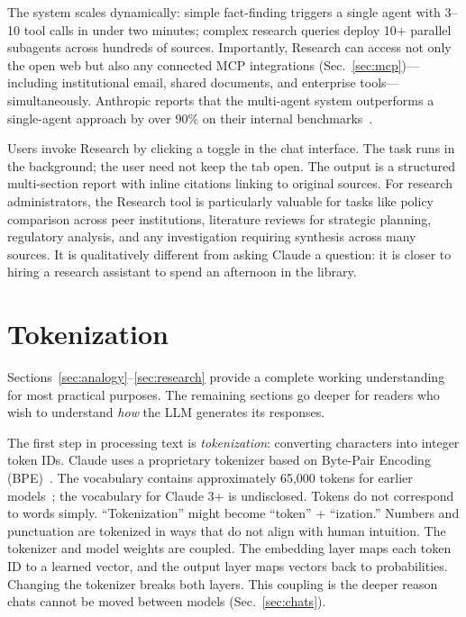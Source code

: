 \documentclass[12pt]{article}
\begin{document}
The system scales dynamically: simple fact-finding triggers a single agent with 3--10 tool calls in under two minutes; complex research queries deploy 10+ parallel subagents across hundreds of sources. Importantly, Research can access not only the open web but also any connected MCP integrations (Sec.~\ref{sec:mcp})---including institutional email, shared documents, and enterprise tools---simultaneously. Anthropic reports that the multi-agent system outperforms a single-agent approach by over 90\% on their internal benchmarks~\cite{anthropic_research_eng}. 

Users invoke Research by clicking a toggle in the chat interface. The task runs in the background; the user need not keep the tab open. The output is a structured multi-section report with inline citations linking to original sources. For research administrators, the Research tool is particularly valuable for tasks like policy comparison across peer institutions, literature reviews for strategic planning, regulatory analysis, and any investigation requiring synthesis across many sources. It is qualitatively different from asking Claude a question: it is closer to hiring a research assistant to spend an afternoon in the library.

\section{Tokenization}
\label{sec:tokenizer}

Sections~\ref{sec:analogy}--\ref{sec:research} provide a complete working understanding for most practical purposes. The remaining sections go deeper for readers who wish to understand \emph{how} the LLM generates its responses.

The first step in processing text is \emph{tokenization}: converting characters into integer token IDs. Claude uses a proprietary tokenizer based on Byte-Pair Encoding (BPE)~\cite{sennrich2016bpe}. The vocabulary contains approximately 65,000 tokens for earlier models~\cite{tokenizer_analysis}; the vocabulary for Claude 3+ is undisclosed. Tokens do not correspond to words simply. ``Tokenization'' might become ``token'' + ``ization.'' Numbers and punctuation are tokenized in ways that do not align with human intuition. The tokenizer and model weights are coupled. The embedding layer maps each token ID to a learned vector, and the output layer maps vectors back to probabilities. Changing the tokenizer breaks both layers. This coupling is the deeper reason chats cannot be moved between models (Sec.~\ref{sec:chats}).
\end{document}
